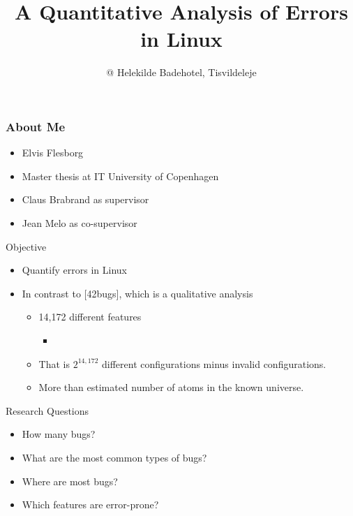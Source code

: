 \documentclass[mathserif,serif]{beamer}
\title{A Quantitative Analysis of Errors in Linux}
\subtitle{@ Helekilde Badehotel, Tisvildeleje}
\newenvironment{items}{
\begin{itemize}
  \setlength{\itemsep}{0pt}
  \setlength{\parskip}{7pt}
  \setlength{\parsep}{4pt}
}{\end{itemize}}
\begin{document}
\frame{\titlepage}

\begin{frame}[t]
    \frametitle{About Me}

    \begin{items}
        \item Elvis Flesborg
        \item Master thesis at IT University of Copenhagen
        \item Claus Brabrand as supervisor
        \item Jean Melo as co-supervisor
    \end{items}
\end{frame}

\begin{frame}[t]{Objective}
    

    \begin{items}
        \item Quantify errors in Linux
        \pause
        \item In contrast to [42bugs], which is a qualitative analysis
        \pause
        \begin{items}
            \item 14,172 different features 
            \begin{items}
                \item {}
            \end{items}
            \item That is \underline{$2^{14,172}$} different configurations minus invalid 
                configurations.
            \item More than estimated number of atoms in the known universe.
        \end{items}
    \end{items}

\end{frame}

\begin{frame}[t]{Research Questions}

    \begin{items}
        \item How many bugs?
        \pause
        \item What are the most common types of bugs?
        \pause
        \item Where are most bugs?
        \pause
        \item Which features are error-prone?
    \end{items}
\end{frame}
\end{document}
